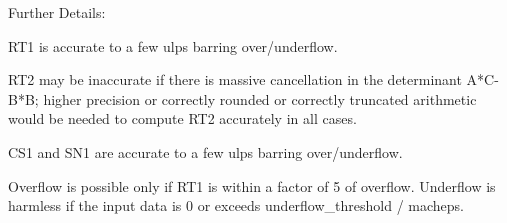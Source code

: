 \begin{DoxyParagraph}{Further Details\+: }
\begin{DoxyVerb}  RT1 is accurate to a few ulps barring over/underflow.

  RT2 may be inaccurate if there is massive cancellation in the
  determinant A*C-B*B; higher precision or correctly rounded or
  correctly truncated arithmetic would be needed to compute RT2
  accurately in all cases.

  CS1 and SN1 are accurate to a few ulps barring over/underflow.

  Overflow is possible only if RT1 is within a factor of 5 of overflow.
  Underflow is harmless if the input data is 0 or exceeds
     underflow_threshold / macheps.\end{DoxyVerb}
 
\end{DoxyParagraph}

